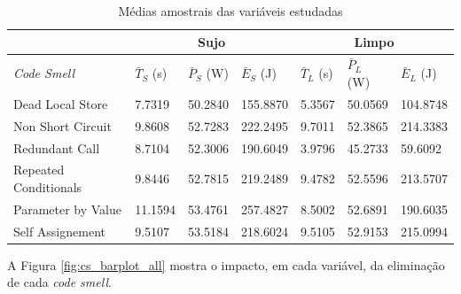 \begin{table}[h]
\centering
\begin{tabular}{l|l|l|l|l|l|l|}
\cline{2-7}
                                            & \multicolumn{3}{c|}{\textbf{Sujo}}                   & \multicolumn{3}{c|}{\textbf{Limpo}}                  \\ \hline
\multicolumn{1}{|l|}{\textit{Code Smell}}   & $ \bar{T}_{S} $ (s) & $ \bar{P}_{S} $ (W) & $ \bar{E}_{S} $  (J) & $ \bar{T}_{L} $  (s) & $ \bar{P}_{L} $ (W) & $ \bar{E}_{L} $ (J) \\ \hline
\multicolumn{1}{|l|}{Dead Local Store}      & 7.7319          & 50.2840         & 155.8870         & 5.3567           & 50.0569         & 104.8748        \\ \hline
\multicolumn{1}{|l|}{Non Short Circuit}     & 9.8608          & 52.7283         & 222.2495         & 9.7011           & 52.3865         & 214.3383        \\ \hline
\multicolumn{1}{|l|}{Redundant Call}        & 8.7104          & 52.3006         & 190.6049         & 3.9796           & 45.2733         & 59.6092         \\ \hline
\multicolumn{1}{|l|}{Repeated Conditionals} & 9.8446          & 52.7815         & 219.2489         & 9.4782           & 52.5596         & 213.5707        \\ \hline
\multicolumn{1}{|l|}{Parameter by Value}    & 11.1594         & 53.4761         & 257.4827         & 8.5002           & 52.6891         & 190.6035        \\ \hline
\multicolumn{1}{|l|}{Self Assignement}      & 9.5107          & 53.5184         & 218.6024         & 9.5105           & 52.9153         & 215.0994        \\ \hline
\end{tabular}
\caption{Médias amostrais das variáveis estudadas}
\label{tab:cs_medias_variaveis}
\end{table}
\FloatBarrier

A Figura \ref{fig:cs_barplot_all} mostra o impacto, em cada variável, da eliminação de cada \emph{code smell}.

